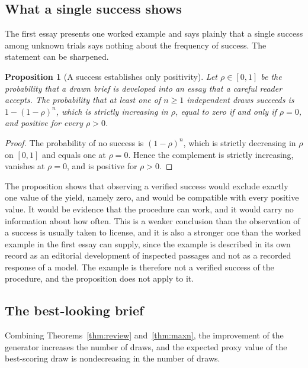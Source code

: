 \documentclass[11pt]{article}
\theoremstyle{plain}
\newtheorem{proposition}[theorem]{Proposition}
\theoremstyle{definition}
\theoremstyle{remark}
\begin{document}
\subsection{What a single success shows}

The first essay presents one worked example and says plainly that a single success among unknown trials says nothing about the frequency of success. The statement can be sharpened.

\begin{proposition}[A success establishes only positivity]\label{prop:success}
Let $\rho\in[0,1]$ be the probability that a drawn brief is developed into an essay that a careful reader accepts. The probability that at least one of $n\ge1$ independent draws succeeds is $1-(1-\rho)^n$, which is strictly increasing in $\rho$, equal to zero if and only if $\rho=0$, and positive for every $\rho>0$.
\end{proposition}

\begin{proof}
The probability of no success is $(1-\rho)^n$, which is strictly decreasing in $\rho$ on $[0,1]$ and equals one at $\rho=0$. Hence the complement is strictly increasing, vanishes at $\rho=0$, and is positive for $\rho>0$. \qedhere
\end{proof}

The proposition shows that observing a verified success would exclude exactly one value of the yield, namely zero, and would be compatible with every positive value. It would be evidence that the procedure can work, and it would carry no information about how often. This is a weaker conclusion than the observation of a success is usually taken to license, and it is also a stronger one than the worked example in the first essay can supply, since the example is described in its own record as an editorial development of inspected passages and not as a recorded response of a model. The example is therefore not a verified success of the procedure, and the proposition does not apply to it.

\subsection{The best-looking brief}

Combining Theorems~\ref{thm:review} and~\ref{thm:maxn}, the improvement of the generator increases the number of draws, and the expected proxy value of the best-scoring draw is nondecreasing in the number of draws.
\end{document}
